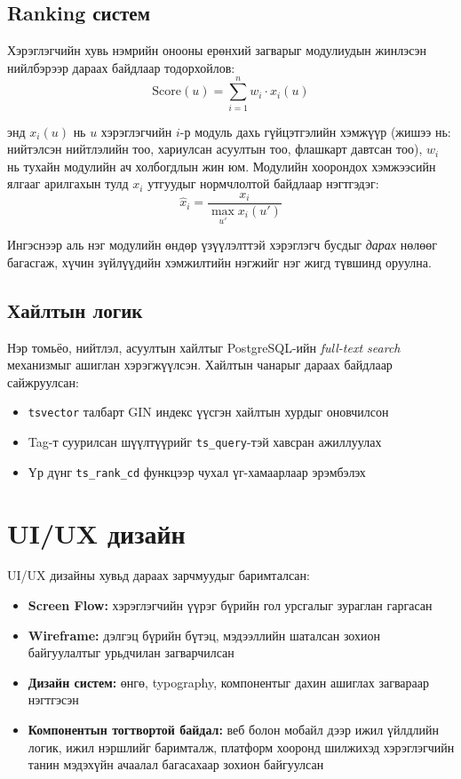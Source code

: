 \subsection{Ranking систем}

Хэрэглэгчийн хувь нэмрийн онооны ерөнхий загварыг модулиудын жинлэсэн нийлбэрээр дараах байдлаар тодорхойлов:
\[
\mathrm{Score}(u) = \sum_{i=1}^{n} w_i \cdot x_i(u)
\]

энд $x_i(u)$ нь $u$ хэрэглэгчийн $i$-р модуль дахь гүйцэтгэлийн хэмжүүр (жишээ нь: нийтэлсэн нийтлэлийн тоо, хариулсан асуултын тоо, флашкарт давтсан тоо), $w_i$ нь тухайн модулийн ач холбогдлын жин юм. Модулийн хоорондох хэмжээсийн ялгааг арилгахын тулд $x_i$ утгуудыг нормчлолтой байдлаар нэгтгэдэг:
\[
\hat{x}_i = \frac{x_i}{\max_{u'} x_i(u')}
\]

Ингэснээр аль нэг модулийн өндөр үзүүлэлттэй хэрэглэгч бусдыг \textit{дарах} нөлөөг багасгаж, хүчин зүйлүүдийн хэмжилтийн нэгжийг нэг жигд түвшинд оруулна.

\subsection{Хайлтын логик}

Нэр томьёо, нийтлэл, асуултын хайлтыг PostgreSQL-ийн \textit{full-text search} механизмыг ашиглан хэрэгжүүлсэн. Хайлтын чанарыг дараах байдлаар сайжруулсан:

\begin{itemize}
    \item \texttt{tsvector} талбарт GIN индекс үүсгэн хайлтын хурдыг оновчилсон
    \item Tag-т суурилсан шүүлтүүрийг \texttt{ts\_query}-тэй хавсран ажиллуулах
    \item Үр дүнг \texttt{ts\_rank\_cd} функцээр чухал үг-хамаарлаар эрэмбэлэх
\end{itemize}

\section{UI/UX дизайн}

UI/UX дизайны хувьд дараах зарчмуудыг баримталсан:

\begin{itemize}
    \item \textbf{Screen Flow:} хэрэглэгчийн үүрэг бүрийн гол урсгалыг зураглан гаргасан
    \item \textbf{Wireframe:} дэлгэц бүрийн бүтэц, мэдээллийн шаталсан зохион байгуулалтыг урьдчилан загварчилсан
    \item \textbf{Дизайн систем:} өнгө, typography, компонентыг дахин ашиглах загвараар нэгтгэсэн
    \item \textbf{Компонентын тогтвортой байдал:} веб болон мобайл дээр ижил үйлдлийн логик, ижил нэршлийг баримталж, платформ хооронд шилжихэд хэрэглэгчийн танин мэдэхүйн ачаалал багасахаар зохион байгуулсан
\end{itemize}

